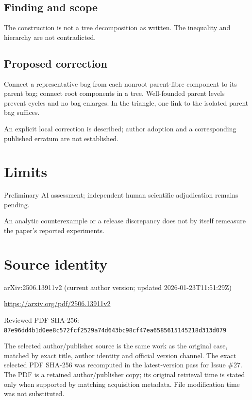 \documentclass[11pt]{article}
\begin{document}
\subsection*{Finding and scope}

The construction is not a tree decomposition as written. The inequality and hierarchy are not contradicted.

\subsection*{Proposed correction}

Connect a representative bag from each nonroot parent-fibre component to its parent bag; connect root components in a tree. Well-founded parent levels prevent cycles and no bag enlarges. In the triangle, one link to the isolated parent bag suffices.

An explicit local correction is described; author adoption and a corresponding published erratum are not established.

\section*{Limits}

Preliminary AI assessment; independent human scientific adjudication remains pending.\par

An analytic counterexample or a release discrepancy does not by itself remeasure the paper’s reported experiments.\par

\section*{Source identity}

arXiv:2506.13911v2 (current author version; updated 2026-01-23T11:51:29Z)

\url{https://arxiv.org/pdf/2506.13911v2}

Reviewed PDF SHA-256: \nolinkurl{87e96dd4b1d0ee8c572fcf2529a74d643bc98cf47ea6585615145218d313d079}

The selected author/publisher source is the same work as the original case, matched by exact title, author identity and official version channel. The exact selected PDF SHA-256 was recomputed in the latest-version pass for Issue \#27. The PDF is a retained author/publisher copy; its original retrieval time is stated only when supported by matching acquisition metadata. File modification time was not substituted.
\end{document}
